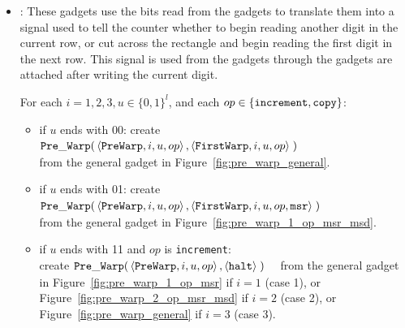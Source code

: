    \begin{itemize}

        \item {\prewarp}: These gadgets use the bits read from the {\cread} gadgets to translate them into
                          a signal used to tell the counter whether to begin reading
                          another digit in the current row, or cut across the rectangle and begin reading the
                          first digit in the next row. This signal is used from the {\prewarp} gadgets through
                          the {\dtop} gadgets are attached after writing the current digit.

            For each $i = 1,2,3, u \in \{0, 1\}^l$, and each $op \in \{ {\tt increment, copy } \}$:
            \begin{itemize}


            \item if $u$ ends with 00:
            create
            $\begin{aligned}[t]
                {\tt Pre\_Warp}(& \left\langle {\tt PreWarp},   i, u, op \right\rangle,
                           \left\langle {\tt FirstWarp}, i, u, op \right\rangle \;)
            \end{aligned}$ \\ from the general gadget in Figure~\ref{fig:pre_warp_general}.

            \item if $u$ ends with 01:
            create
            $\begin{aligned}[t]
                {\tt Pre\_Warp}(& \left\langle {\tt PreWarp},   i, u, op \right\rangle,
                           \left\langle {\tt FirstWarp}, i, u, op, {\tt msr} \right\rangle \;)
            \end{aligned}$ \\ from the general gadget in Figure~\ref{fig:pre_warp_1_op_msr_msd}.


            \item if $u$ ends with 11 and $op$ is {\tt increment}:\\
            create
            $\begin{aligned}[t]
                {\tt Pre\_Warp}(& \left\langle {\tt PreWarp},   i, u, op \right\rangle,
                           \left\langle {\tt halt}                  \right\rangle \;)
            \end{aligned}$ from the general gadget in Figure~\ref{fig:pre_warp_1_op_msr} if $i = 1$ (case 1),
            or Figure~\ref{fig:pre_warp_2_op_msr_msd} if $i = 2$ (case 2), or Figure~\ref{fig:pre_warp_general} if $i = 3$ (case 3).



\end{itemize}
\end{itemize}
